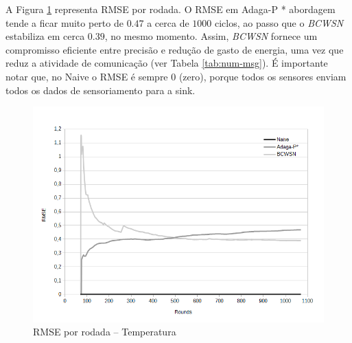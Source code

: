 \documentclass{acm_proc_article-sp}
\begin{document}
A Figura \ref{fig:rmse} representa RMSE por rodada. O RMSE em Adaga-P * 
abordagem tende a ficar muito perto de $0.47$ a cerca de $1000$ ciclos,
ao passo que o {\it BCWSN} estabiliza em cerca $0.39$, no mesmo momento.
Assim, {\it BCWSN} fornece um compromisso eficiente entre precisão e redução
de gasto de energia, uma vez que reduz a atividade de comunicação
(ver Tabela \ref{tab:num-msg}). É importante notar que, no Naive 
o RMSE é sempre 0 (zero), porque todos os sensores enviam todos os dados
de sensoriamento para a sink.
\vspace*{-.3cm}

\begin{figure}[!htb]
\begin{center}
	\includegraphics[scale=0.4]{BCWSN-RMSExRound-PB-Temp.png}
	 \vspace*{-.5cm}
	\caption{RMSE por rodada – Temperatura}
    \label{fig:rmse}
\end{center}
\end{figure}
\vspace*{-.3cm}
\end{document}
